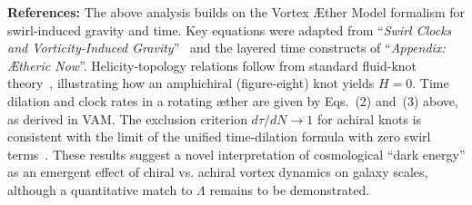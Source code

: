 \documentclass[11pt]{article}
\begin{document}
    \textbf{References:} The above analysis builds on the Vortex Æther Model formalism for swirl-induced gravity and time. Key equations were adapted from “\textit{Swirl Clocks and Vorticity-Induced Gravity}”~\cite{iskandarani2025vam2} and the layered time constructs of “\textit{Appendix: Ætheric Now}”. Helicity-topology relations follow from standard fluid-knot theory~\cite{knot_theroy_in_fluid}, illustrating how an amphichiral (figure-eight) knot yields $H=0$. Time dilation and clock rates in a rotating æther are given by Eqs.~(2) and~(3) above, as derived in VAM. The exclusion criterion $d\tau/dN\to1$ for achiral knots is consistent with the limit of the unified time-dilation formula with zero swirl terms~\cite{iskandarani2025vam2}. These results suggest a novel interpretation of cosmological “dark energy” as an emergent effect of chiral vs. achiral vortex dynamics on galaxy scales, although a quantitative match to $\Lambda$ remains to be demonstrated.

    \appendix
    \def\standalonechapter{false}
    
    
    
\end{document}
